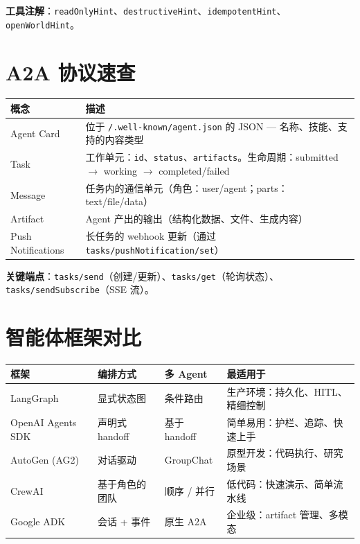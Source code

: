\textbf{工具注解}：\texttt{readOnlyHint}、\texttt{destructiveHint}、\texttt{idempotentHint}、\texttt{openWorldHint}。

\section{A2A 协议速查}
\label{a2a-protocol-quick-reference}

\noindent\begin{tabularx}{\linewidth}{@{}l Z{1}@{}}
\toprule
\textbf{概念} & \textbf{描述} \\
\midrule
Agent Card & 位于 \texttt{/.well-known/agent.json} 的 JSON --- 名称、技能、支持的内容类型 \\
Task & 工作单元：\texttt{id}、\texttt{status}、\texttt{artifacts}。生命周期：submitted $\to$ working $\to$ completed/failed \\
Message & 任务内的通信单元（角色：user/agent；parts：text/file/data） \\
Artifact & Agent 产出的输出（结构化数据、文件、生成内容） \\
Push Notifications & 长任务的 webhook 更新（通过 \texttt{tasks/pushNotification/set}） \\
\bottomrule
\end{tabularx}

\textbf{关键端点}：\texttt{tasks/send}（创建/更新）、\texttt{tasks/get}（轮询状态）、\texttt{tasks/sendSubscribe}（SSE 流）。

\section{智能体框架对比}
\label{agent-framework-comparison}

\noindent\begin{tabularx}{\linewidth}{@{}l Z{0.8} Z{0.5} Z{1.7}@{}}
\toprule
\textbf{框架} & \textbf{编排方式} & \textbf{多 Agent} & \textbf{最适用于} \\
\midrule
LangGraph & 显式状态图 & 条件路由 & 生产环境：持久化、HITL、精细控制 \\
OpenAI Agents SDK & 声明式 handoff & 基于 handoff & 简单易用：护栏、追踪、快速上手 \\
AutoGen (AG2) & 对话驱动 & GroupChat & 原型开发：代码执行、研究场景 \\
CrewAI & 基于角色的团队 & 顺序 / 并行 & 低代码：快速演示、简单流水线 \\
Google ADK & 会话 + 事件 & 原生 A2A & 企业级：artifact 管理、多模态 \\
\bottomrule
\end{tabularx}

